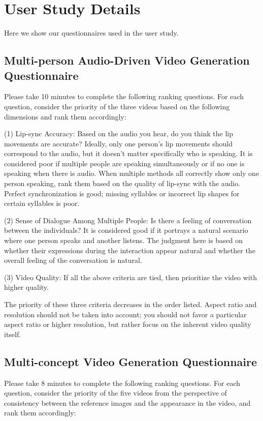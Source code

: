 \documentclass{article} %
\begin{document}
\section{User Study Details}
Here we show our questionnaires used in the user study.
\subsection{Multi-person Audio-Driven Video Generation Questionnaire}

Please take 10 minutes to complete the following ranking questions. For each question, consider the priority of the three videos based on the following dimensions and rank them accordingly:

(1) Lip-sync Accuracy: Based on the audio you hear, do you think the lip movements are accurate? Ideally, only one person's lip movements should correspond to the audio, but it doesn't matter specifically who is speaking. It is considered poor if multiple people are speaking simultaneously or if no one is speaking when there is audio. When multiple methods all correctly show only one person speaking, rank them based on the quality of lip-sync with the audio. Perfect synchronization is good; missing syllables or incorrect lip shapes for certain syllables is poor.

(2) Sense of Dialogue Among Multiple People: Is there a feeling of conversation between the individuals? It is considered good if it portrays a natural scenario where one person speaks and another listens. The judgment here is based on whether their expressions during the interaction appear natural and whether the overall feeling of the conversation is natural.

(3) Video Quality: If all the above criteria are tied, then prioritize the video with higher quality.

The priority of these three criteria decreases in the order listed. Aspect ratio and resolution should not be taken into account; you should not favor a particular aspect ratio or higher resolution, but rather focus on the inherent video quality itself.

\subsection{Multi-concept Video Generation Questionnaire}

Please take 8 minutes to complete the following ranking questions. For each question, consider the priority of the five videos from the perspective of consistency between the reference images and the appearance in the video, and rank them accordingly:
\end{document}
